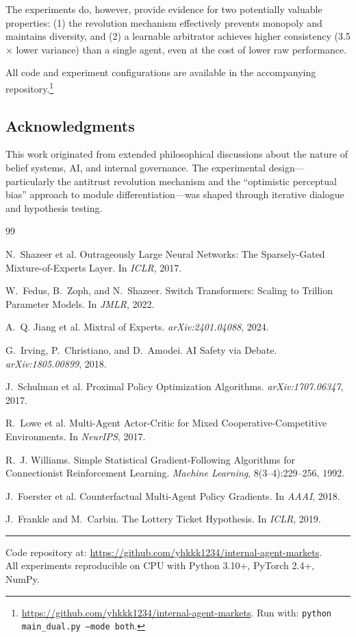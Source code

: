 \documentclass[a4paper,11pt]{article}
\begin{document}
The experiments do, however, provide evidence for two potentially valuable properties: (1) the revolution mechanism effectively prevents monopoly and maintains diversity, and (2) a learnable arbitrator achieves higher consistency (3.5$\times$ lower variance) than a single agent, even at the cost of lower raw performance.

All code and experiment configurations are available in the accompanying repository.\footnote{\url{https://github.com/yhkkk1234/internal-agent-markets}. Run with: \texttt{python main\_dual.py --mode both}.}

\subsection*{Acknowledgments}

This work originated from extended philosophical discussions about the nature of belief systems, AI, and internal governance. The experimental design---particularly the antitrust revolution mechanism and the ``optimistic perceptual bias'' approach to module differentiation---was shaped through iterative dialogue and hypothesis testing.

\begin{thebibliography}{99}

N.~Shazeer et al.
\newblock Outrageously Large Neural Networks: The Sparsely-Gated Mixture-of-Experts Layer.
\newblock In \textit{ICLR}, 2017.

W.~Fedus, B.~Zoph, and N.~Shazeer.
\newblock Switch Transformers: Scaling to Trillion Parameter Models.
\newblock In \textit{JMLR}, 2022.

A.~Q. Jiang et al.
\newblock Mixtral of Experts.
\newblock \textit{arXiv:2401.04088}, 2024.

G.~Irving, P.~Christiano, and D.~Amodei.
\newblock AI Safety via Debate.
\newblock \textit{arXiv:1805.00899}, 2018.

J.~Schulman et al.
\newblock Proximal Policy Optimization Algorithms.
\newblock \textit{arXiv:1707.06347}, 2017.

R.~Lowe et al.
\newblock Multi-Agent Actor-Critic for Mixed Cooperative-Competitive Environments.
\newblock In \textit{NeurIPS}, 2017.

R.~J. Williams.
\newblock Simple Statistical Gradient-Following Algorithms for Connectionist Reinforcement Learning.
\newblock \textit{Machine Learning}, 8(3--4):229--256, 1992.

J.~Foerster et al.
\newblock Counterfactual Multi-Agent Policy Gradients.
\newblock In \textit{AAAI}, 2018.

J.~Frankle and M.~Carbin.
\newblock The Lottery Ticket Hypothesis.
\newblock In \textit{ICLR}, 2019.

\end{thebibliography}

\vspace{1cm}
\noindent\rule{\textwidth}{0.4pt}
\begin{center}
\small
Code repository at: \url{https://github.com/yhkkk1234/internal-agent-markets}.\\
All experiments reproducible on CPU with Python 3.10+, PyTorch 2.4+, NumPy.
\end{center}
\end{document}
